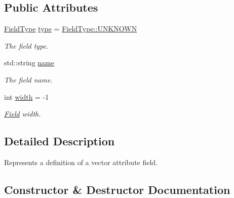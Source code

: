 \subsection*{Public Attributes}
\begin{DoxyCompactItemize}
\item 
\hyperlink{group___vector_module_gaedcee2e418daac47dd4516efa9a0b99d}{Field\+Type} \hyperlink{structdg_1_1deepcore_1_1vector_1_1_field_definition_a50e975eabe1343b91e398322cc990aea}{type} = \hyperlink{namespacedg_1_1deepcore_1_1vector_gaedcee2e418daac47dd4516efa9a0b99da696b031073e74bf2cb98e5ef201d4aa3}{Field\+Type\+::\+U\+N\+K\+N\+O\+WN}
\begin{DoxyCompactList}\small\item\em The field type. \end{DoxyCompactList}\item 
std\+::string \hyperlink{structdg_1_1deepcore_1_1vector_1_1_field_definition_afe210a024b6230d92260b73d4b0354b9}{name}
\begin{DoxyCompactList}\small\item\em The field name. \end{DoxyCompactList}\item 
int \hyperlink{structdg_1_1deepcore_1_1vector_1_1_field_definition_ae8230841926a1f3c2800397adad755d4}{width} = -\/1
\begin{DoxyCompactList}\small\item\em \hyperlink{structdg_1_1deepcore_1_1vector_1_1_field}{Field} width. \end{DoxyCompactList}\end{DoxyCompactItemize}


\subsection{Detailed Description}
Represents a definition of a vector attribute field. 

\subsection{Constructor \& Destructor Documentation}
